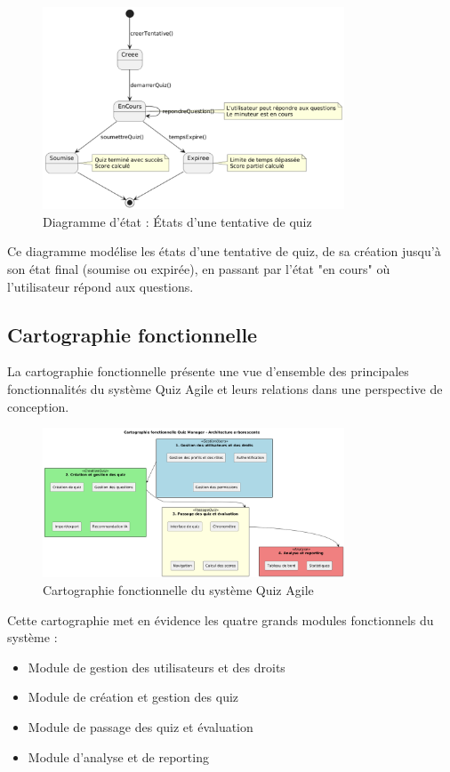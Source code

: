 \documentclass[12pt,a4paper]{report}
\begin{document}
\begin{figure}[htbp]
    \centering
    \includegraphics[width=0.8\textwidth]{latex_media/media/Diagrammedetat-Tentative de Quiz.png}
    \caption{Diagramme d'état : États d'une tentative de quiz}
    \label{fig:etat-tentative-quiz}
\end{figure}

Ce diagramme modélise les états d'une tentative de quiz, de sa création jusqu'à son état final (soumise ou expirée), en passant par l'état "en cours" où l'utilisateur répond aux questions.

\subsection{Cartographie fonctionnelle}

La cartographie fonctionnelle présente une vue d'ensemble des principales fonctionnalités du système Quiz Agile et leurs relations dans une perspective de conception.

\begin{figure}[H]
\centering
\includegraphics[width=0.8\textwidth]{latex_media/media/image11.png}
\caption{Cartographie fonctionnelle du système Quiz Agile}
\label{fig:cartographie-fonctionnelle}
\end{figure}

Cette cartographie met en évidence les quatre grands modules fonctionnels du système :
\begin{itemize}
\item Module de gestion des utilisateurs et des droits
\item Module de création et gestion des quiz
\item Module de passage des quiz et évaluation
\item Module d'analyse et de reporting
\end{itemize}
\end{document}
